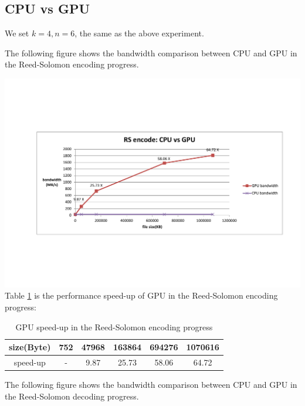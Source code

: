 \documentclass[a4paper]{article}
\begin{document}
\subsection{CPU vs GPU}

We set $k=4, n=6$, the same as the above experiment.

The following figure shows the bandwidth comparison between CPU and GPU in the Reed-Solomon encoding progress.

\includegraphics[scale=0.48]{result-graph/encode-CPU-vs-GPU-graph.pdf}
Table \ref{encoding-speed-up} is the performance speed-up of GPU in the Reed-Solomon encoding progress:
\begin{table}
\caption{
GPU speed-up in the Reed-Solomon encoding progress
}
\begin{center}
\begin{tabular}{|c|c|c|c|c|c|}
\hline
size(Byte) &  752 & 47968 & 163864 & 694276 & 1070616 \\
\hline
speed-up   &  -   & 9.87  & 25.73  & 58.06  & 64.72 \\
\hline
\end{tabular}
\label{encoding-speed-up}
\end{center}
\end{table}

The following figure shows the bandwidth comparison between CPU and GPU in the Reed-Solomon decoding progress.
\end{document}
